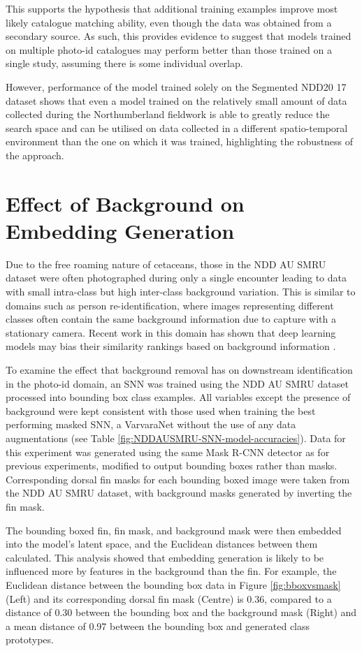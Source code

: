 This supports the hypothesis that additional training examples improve most likely catalogue matching ability, even though the data was obtained from a secondary source. As such, this provides evidence to suggest that models trained on multiple photo-id catalogues may perform better than those trained on a single study, assuming there is some individual overlap.

However, performance of the model trained solely on the Segmented NDD20 17 dataset shows that even a model trained on the relatively small amount of data collected during the Northumberland fieldwork is able to greatly reduce the search space and can be utilised on data collected in a different spatio-temporal environment than the one on which it was trained, highlighting the robustness of the approach. 

\section{Effect of Background on Embedding Generation}\label{ch:SNNEvaluation,sec:EffectOfNoise}

Due to the free roaming nature of cetaceans, those in the NDD AU SMRU dataset were often photographed during only a single encounter leading to data with small intra-class but high inter-class background variation. This is similar to domains such as person re-identification, where images representing different classes often contain the same background information due to capture with a stationary camera. Recent work in this domain has shown that deep learning models may bias their similarity rankings based on background information \cite{tian_eliminating_2018}. 

To examine the effect that background removal has on downstream identification in the photo-id domain, an SNN was trained using the NDD AU SMRU dataset processed into bounding box class examples. All variables except the presence of background were kept consistent with those used when training the best performing masked SNN, a VarvaraNet without the use of any data augmentations (see Table \ref{fig:NDDAUSMRU-SNN-model-accuracies}). Data for this experiment was generated using the same Mask R-CNN detector as for previous experiments, modified to output bounding boxes rather than masks. Corresponding dorsal fin masks for each bounding boxed image were taken from the NDD AU SMRU dataset, with background masks generated by inverting the fin mask. 

The bounding boxed fin, fin mask, and background mask were then embedded into the model's latent space, and the Euclidean distances between them calculated. This analysis showed that embedding generation is likely to be influenced more by features in the background than the fin. For example, the Euclidean distance between the bounding box data in Figure \ref{fig:bboxvsmask} (Left) and its corresponding dorsal fin mask (Centre) is 0.36, compared to a distance of 0.30 between the bounding box and the background mask (Right) and a mean distance of 0.97 between the bounding box and generated class prototypes. 

